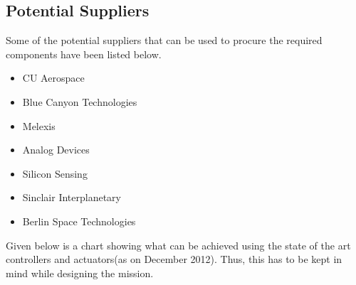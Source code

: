 \subsection{Potential Suppliers}
Some of the potential suppliers that can be used to procure the required components have been listed below. 
\begin{itemize}
\item CU Aerospace
\item Blue Canyon Technologies
\item Melexis
\item Analog Devices
\item Silicon Sensing
\item Sinclair Interplanetary
\item Berlin Space Technologies
\end{itemize}

Given below is a chart showing what can be achieved using the state of the art controllers and actuators(as on December 2012). Thus, this has to be kept in mind while designing the mission. 

